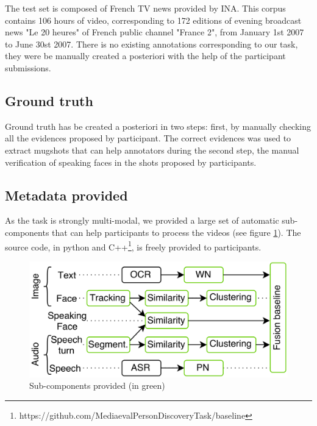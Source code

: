 \documentclass{acm_proc_article-me}
\begin{document}
The test set is composed of French TV news provided by INA. This corpus contains 106 hours of video, corresponding to 172 editions of evening broadcast news "Le 20 heures" of French public channel "France 2", from January 1st 2007 to June 30st 2007. There is no existing annotations corresponding to our task, they were be manually created a posteriori with the help of the participant submissions.


\subsection{Ground truth}

Ground truth has be created a posteriori in two steps: first, by manually checking all the evidences proposed by participant. The correct evidences was used to extract mugshots that can help annotators during the second step, the manual verification of speaking faces in the shots proposed by participants.

\subsection{Metadata provided}

As the task is strongly multi-modal, we provided a large set of automatic sub-components that can help participants to process the videos (see figure \ref{fig:baseline}). The source code, in python and C++\footnote{https://github.com/MediaevalPersonDiscoveryTask/baseline}, is freely provided to participants. 

\begin{figure}[htb]
 \center 
 \includegraphics[width=1\linewidth]{figs/baseline.png}
 \centering
 \caption {Sub-components provided (in green)}
 \label{fig:baseline}
\end{figure}
\end{document}
